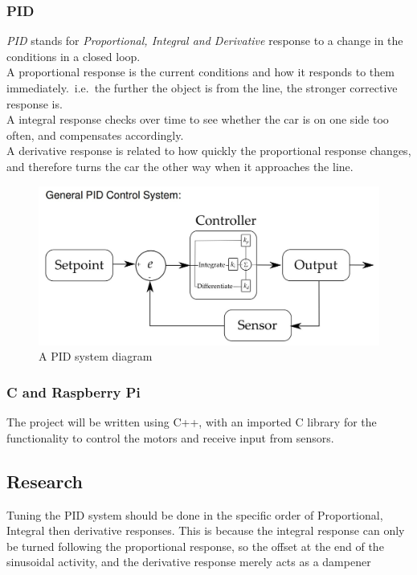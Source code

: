 \documentclass[paper=a4, fontsize=11pt]{scrartcl} %
\numberwithin{equation}{section} %
\numberwithin{figure}{section} %
\begin{document}
\subsubsection{PID}
\textit{PID} stands for \textit{Proportional, Integral and Derivative} response
to a change in the conditions in a closed loop.\\
A proportional response is the current conditions and how it responds to them
immediately.\ i.e.\ the further the object is from the line, the stronger
corrective response is.\\
A integral response checks over time to see whether the car is on one side too
often, and compensates accordingly.\\
A derivative response is related to how quickly the proportional response
changes, and therefore turns the car the other way when it approaches the line.
\begin{figure}[h]
  \centering
  \includegraphics[width=\textwidth]{pid.png}
  \caption{A PID system diagram\autocite{elfClosedLoops}}
\end{figure}
\subsubsection{C and Raspberry Pi}
The project will be written using C++, with  an imported C library for the
functionality to control the motors and receive input from sensors.\\
\subsection{Research}
Tuning the PID system should be done in the specific order of Proportional,
Integral then derivative responses. This is because the integral response can
only be turned following the proportional response, so the offset at the end of
the sinusoidal activity, and the derivative response merely acts as a
dampener\autocite{pidTuning}
\autocite{pidVid}
\end{document}
